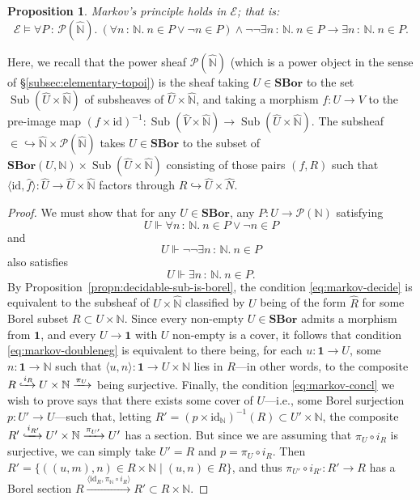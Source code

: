 \documentclass[11pt]{amsart}
\newcommand\br[1]{\langle{}#1\rangle{}}
\newcommand\cE{\mathcal{E}}
\newcommand\hto{\hookrightarrow}
\newcommand\htox[2][]{\xhookrightarrow[#1]{#2}}
\newcommand\I{^{-1}}
\newcommand\id{\mathrm{id}}
\newcommand{\N}{\mathbb{N}}
\newcommand\pow{\mathcal{P}}
\newcommand\SBor{\mathbf{SBor}}
\newcommand\set[2][]{#1\{{#2}#1\}}
\newcommand\Sub{\operatorname{Sub}}
\newcommand\tm{\mathbf{1}}
\newcommand\tolon{{\,:\,}}
\newcommand\tox[2][]{\xrightarrow[#1]{#2}}
\newcommand\unin{{\in}}
\newcommand\wh[1]{\widehat{#1}}
\theoremstyle{definition}
\theoremstyle{remark}
\theoremstyle{plain}
\newtheorem{propn}[defn]{Proposition}
\begin{document}
\begin{propn}
  Markov's principle \cite[\S8]{hyland-effective-topos} holds in \( \cE \); that is:
  \[
    \cE \vDash \forall P \tolon \pow(\wh \N).\
    (\forall n \tolon \N.\ n \in P \vee \neg n \in P) \wedge
    \neg \neg \exists n \tolon \N.\ n \in P \to
    \exists n \tolon \N.\ n \in P.
  \]
\end{propn}
\noindent
Here, we recall that the power sheaf \( \pow(\wh \N) \) (which is a power object in the sense of \S\ref{subsec:elementary-topoi}) is the sheaf taking \( U \in \SBor \) to the set \( \Sub(\wh{U} \times \wh{\N}) \) of subsheaves of \( \wh{U} \times \wh{\N} \), and taking a morphism \( f \colon U \to V \) to the pre-image map \( (f \times \id)\I \colon \Sub(\wh V \times \wh \N) \to \Sub(\wh U \times \wh \N) \).
The subsheaf \( \unin \hto \wh \N \times \pow(\wh \N) \) takes \( U \in \SBor \) to the subset of \( \SBor(U,\N) \times \Sub(\wh U \times \wh \N) \) consisting of those pairs \( (f, R) \) such that \( \br{\id, \hat f} \colon \wh U \to \wh U \times \wh \N \) factors through \( R \hto \wh U \times \wh N \).
\begin{proof}
  We must show that for any \( U \in \SBor \), any \( P \colon U \to \pow(\N) \) satisfying
  \begin{equation} \label{eq:markov-decide}
    U \Vdash \forall n \tolon \N.\ n \in P \vee \neg n \in P
\end{equation}
  and
  \begin{equation} \label{eq:markov-doubleneg}
    U \Vdash \neg \neg \exists n \tolon \N.\ n \in P
  \end{equation}
  also satisfies
  \begin{equation} \label{eq:markov-concl}
    U \Vdash \exists n \tolon \N.\ n \in P.
  \end{equation}
  By Proposition~\ref{propn:decidable-sub-is-borel}, the condition \eqref{eq:markov-decide} is equivalent to the subsheaf of \( \wh U \times \wh \N \) classified by \( U \) being of the form \( \wh R \) for some Borel subset \( R \subset U \times \N \).
  Since every non-empty \( U \in \SBor \) admits a morphism from \( \tm \), and every \( U \to \tm \) with \( U \) non-empty is a cover, it follows that condition \eqref{eq:markov-doubleneg} is equivalent to there being, for each \( u \colon \tm \to U \), some \( n \colon \tm \to \N \) such that \( \br{u,n} \colon \tm \to U \times \N \) lies in \( R \)---in other words, to the composite \( R \htox{i_R} U \times \N \tox{\pi_U} \) being surjective.
  Finally, the condition \eqref{eq:markov-concl} we wish to prove says that there exists some cover of \( U \)---i.e., some Borel surjection \( p \colon U' \to U \)---such that, letting \( R' = (p \times \id_\N)\I(R) \subset U' \times \N \), the composite \( R' \htox{i_{R'}} U' \times \N \tox{\pi_{U'}} U' \) has a section.
  But since we are assuming that \( \pi_U \circ i_R \) is surjective, we can simply take \( U' = R \) and \( p = \pi_U \circ i_R \).
  Then \( R' = \set{((u,m),n) \in R \times \N \mid (u,n) \in R} \), and thus \( \pi_{U'} \circ i_{R'} \colon R' \to R \) has a Borel section \( R \tox{\br{\id_R,\pi_\N \circ i_R}} R' \subset R \times \N \).
\end{proof}
\end{document}

